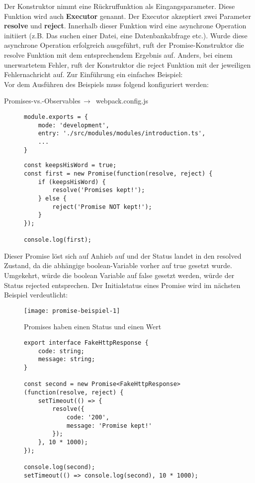Der Konstruktor nimmt eine Rückruffunktion als Eingangsparameter. Diese Funktion wird auch \textbf{Executor} genannt.\cite{promise-executor} Der Executor akzeptiert zwei Parameter \textbf{resolve} und \textbf{reject}. Innerhalb dieser Funktion wird eine asynchrone Operation initiiert (z.B. Das suchen einer Datei, eine Datenbankabfrage etc.). Wurde diese asynchrone Operation erfolgreich ausgeführt, ruft der Promise-Konstruktor die resolve Funktion mit dem entsprechendem Ergebnis auf. Anders, bei einem unerwartetem Fehler, ruft der Konstruktor die reject Funktion mit der jeweiligen Fehlernachricht auf. Zur Einführung ein einfaches Beispiel:\\

\noindent
Vor dem Ausführen des Beispiels muss folgend konfiguriert werden:

 \begin{center}
     Promises-vs.-Observables$\,\to\,$ webpack.config.js
 \end{center}

\begin{figure}[H]
\begin{lstlisting}
module.exports = {
    mode: 'development',
    entry: './src/modules/modules/introduction.ts',
    ...
}
\end{lstlisting}
\end{figure}

\begin{figure}[H]
\begin{lstlisting}
const keepsHisWord = true;
const first = new Promise(function(resolve, reject) {
    if (keepsHisWord) {
        resolve('Promises kept!');
    } else {
        reject('Promise NOT kept!');
    }
});

console.log(first);
\end{lstlisting}
\end{figure}

\noindent
Dieser Promise löst sich auf Anhieb auf und der Status landet in den resolved Zustand, da die abhängige boolean-Variable vorher auf true gesetzt wurde. Umgekehrt, würde die boolean Variable auf false gesetzt werden, würde der Status rejected entsprechen. Der Initialstatus eines Promise wird im nächsten Beispiel verdeutlicht:

\begin{figure}[H]
\centering
\texttt{[image: promise-beispiel-1]}
\caption{Promises haben einen Status und einen Wert}
\end{figure}

\begin{figure}[H]
\begin{lstlisting}
export interface FakeHttpResponse {
    code: string;
    message: string;
}

const second = new Promise<FakeHttpResponse>(function(resolve, reject) {
    setTimeout(() => {
        resolve({
            code: '200',
            message: 'Promise kept!'
        });
    }, 10 * 1000);
});

console.log(second);
setTimeout(() => console.log(second), 10 * 1000);
\end{lstlisting}
\end{figure}

